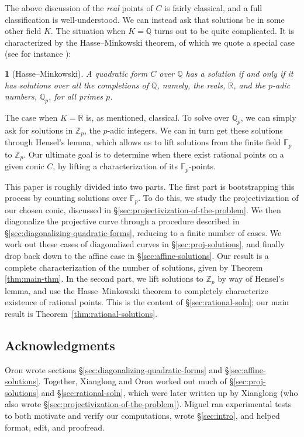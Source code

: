 \documentclass[10pt,a4paper]{amsart}
\numberwithin{equation}{section}
\numberwithin{figure}{section}
\numberwithin{table}{section}
\theoremstyle{definition}
\theoremstyle{plain}
\newtheorem{thm}{\protect\theoremname}[section]
\theoremstyle{remark}
\theoremstyle{plain}
\theoremstyle{definition}
\theoremstyle{plain}
\theoremstyle{plain}
\providecommand{\theoremname}{Theorem}
\newcommand{\F}{\mathbb{F}}
\newcommand{\Z}{\mathbb{Z}}
\newcommand{\Q}{\mathbb{Q}}
\newcommand{\R}{\mathbb{R}}
\begin{document}
	The above discussion of the \emph{real} points of $C$ is fairly classical,
	and a full classification is well-understood. We can instead ask that solutions
	be in some other field $K$.
	The situation when $K=\Q$ turns out to be quite complicated. It is
	characterized by the Hasse--Minkowski theorem, of which we quote a special
	case (see for instance \cite[\S IV.3, Thm.~8]{serre}):
	\begin{thm}[Hasse--Minkowski]
		A quadratic form $C$ over $\Q$ has a solution if and only if it has solutions
		over all the completions of $\Q$, namely, the reals, $\R$, and the $p$-adic
		numbers, $\Q_p$, for all primes $p$.
	\end{thm}
	The case when $K = \R$ is, as mentioned, classical. To solve over $\Q_p$,
	we can simply ask for solutions in $\Z_p$, the $p$-adic integers. We
	can in turn get these solutions through Hensel's lemma, which allows us
	to lift solutions from the finite field $\F_p$ to $\Z_p$. Our ultimate
	goal is to determine when there exist rational points on a given conic $C$, by lifting
	a characterization of its $\F_p$-points.
	
	This paper is roughly divided into two parts. The first part
	is bootstrapping this process by counting solutions over $\F_p$. To do this,
	we study the projectivization of our chosen conic, discussed in
	\S\ref{sec:projectivization-of-the-problem}. We then diagonalize 
	the projective curve through a procedure described in 
	\S\ref{sec:diagonalizing-quadratic-forms}, reducing to a finite number of cases. We work out these cases
	of diagonalized curves in \S\ref{sec:proj-solutions}, and finally
	drop back down to the affine case in \S\ref{sec:affine-solutions}. Our result
	is a complete characterization of the number of solutions, given by 
	Theorem \ref{thm:main-thm}.
	In the second part, we lift solutions to $\Z_p$ by way of
	Hensel's lemma, and use the Hasse--Minkowski theorem
	to completely characterize existence of rational points. This is the content of \S\ref{sec:rational-soln}; our main result is Theorem~\ref{thm:rational-solutions}.
	
	\subsection*{Acknowledgments} Oron wrote sections \S\ref{sec:diagonalizing-quadratic-forms} and \S\ref{sec:affine-solutions}. Together, Xianglong and Oron worked out much of \S\ref{sec:proj-solutions} and \S\ref{sec:rational-soln}, which were later written up by Xianglong (who also wrote \S\ref{sec:projectivization-of-the-problem}). Miguel ran experimental tests to both motivate and verify our computations, wrote \S\ref{sec:intro}, and helped format, edit, and proofread.
	
\end{document}
